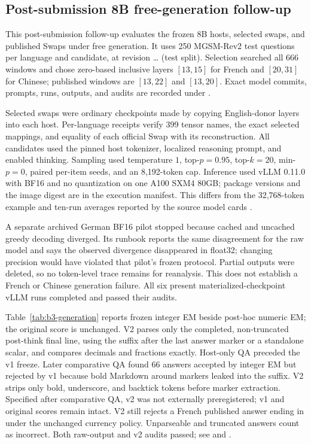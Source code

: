 \subsection{Post-submission 8B free-generation follow-up}
\label{app:b3-generation}

This post-submission follow-up evaluates the frozen 8B hosts, selected swaps,
and published Swaps under free generation. It uses 250 MGSM-Rev2 test
questions per language and candidate, at revision
\ldots{} (test split). Selection searched all 666 windows
and chose zero-based inclusive layers $[13,15]$ for French and $[20,31]$ for
Chinese; published windows are $[13,22]$ and $[13,20]$. Exact model commits,
prompts, runs, outputs, and audits are recorded under
.

Selected swaps were ordinary checkpoints made by copying English-donor layers
into each host. Per-language receipts verify 399 tensor names, the exact
selected mappings, and equality of each official Swap with its reconstruction.
All candidates used the pinned host tokenizer, localized reasoning prompt,
and enabled thinking. Sampling used temperature $1$, top-$p=0.95$, top-$k=20$,
min-$p=0$, paired per-item seeds, and an 8,192-token cap. Inference used vLLM
0.11.0 with BF16 and no quantization on one A100 SXM4 80GB; package versions
and the image digest are in the execution manifest. This differs from the
32,768-token example and ten-run averages reported by the source model cards
\citep{lasbordes2026rethinking}.

A separate archived German BF16 pilot stopped because cached and uncached
greedy decoding diverged. Its runbook reports the same disagreement for the
raw model and says the observed divergence disappeared in float32; changing
precision would have violated that pilot's frozen protocol. Partial outputs
were deleted, so no token-level trace remains for reanalysis. This does not
establish a French or Chinese generation failure. All six present
materialized-checkpoint vLLM runs completed and passed their audits.

Table~\ref{tab:b3-generation} reports frozen integer EM beside post-hoc
numeric EM; the original score is unchanged. V2 parses only the completed,
non-truncated post-think final line, using the suffix after the last answer
marker or a standalone scalar, and compares decimals and fractions exactly.
Host-only QA preceded the v1 freeze. Later comparative QA found 66 answers
accepted by integer EM but rejected by v1 because bold Markdown around markers
leaked into the suffix. V2 strips only bold, underscore, and backtick tokens
before marker extraction. Specified after comparative QA, v2 was not externally
preregistered; v1 and original scores remain intact. V2 still rejects a French
published answer ending in  under the unchanged currency
policy. Unparseable and truncated answers count as incorrect. Both raw-output
and v2 audits passed; see
 and
.

